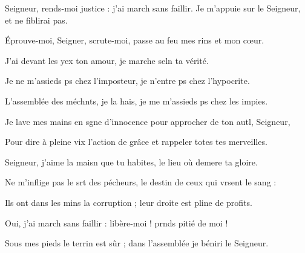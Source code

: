 \item Seigneur, rends-moi justice : j’ai march sans faillir.\psstar{} Je m’appuie sur le Seigneur, et ne fiblirai pas.
\item Éprouve-moi, Seigner, scrute-moi,\psstar{} passe au feu mes rins et mon cœur.
\item J’ai devant les yex ton amour,\psstar{} je marche seln ta vérité.
\item Je ne m’assieds ps chez l’imposteur,\psstar{} je n’entre ps chez l’hypocrite.
\item L’assemblée des méchnts, je la hais,\psstar{} je me m’assieds ps chez les impies.
\item Je lave mes mains en sgne d’innocence\psstar{} pour approcher de ton autl, Seigneur,
\item Pour dire à pleine vix l’action de grâce\psstar{} et rappeler totes tes merveilles.
\item Seigneur, j’aime la maisn que tu habites,\psstar{} le lieu où demere ta gloire.
\item Ne m’inflige pas le srt des pécheurs,\psstar{} le destin de ceux qui vrsent le sang :
\item Ils ont dans les mins la corruption ;\psstar{} leur droite est pline de profits.
\item Oui, j’ai march sans faillir :\psstar{} libère-moi ! prnds pitié de moi !
\item Sous mes pieds le terrin est sûr ;\psstar{} dans l’assemblée je béniri le Seigneur.